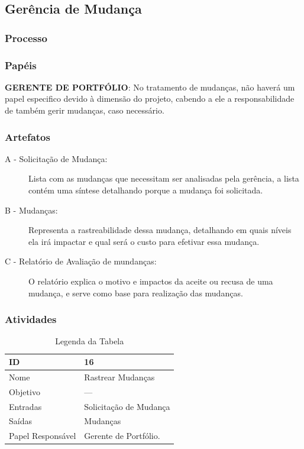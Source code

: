 \subsection{Gerência de Mudança}\label{sec:gerencia}
\subsubsection{Processo}
\subsubsection{Papéis}

  \textbf{GERENTE DE PORTFÓLIO}: No tratamento de mudanças, não haverá um papel especifico devido
à dimensão do projeto, cabendo a ele a responsabilidade de também gerir mudanças, caso necessário.

\subsubsection{Artefatos}

\begin{description}
  \item[A - Solicitação de Mudança: ]
  Lista com as mudanças que necessitam ser analisadas pela gerência, a lista contém
  uma síntese detalhando porque a mudança foi solicitada.
  \item [B - Mudanças: ] Representa a rastreabilidade dessa mudança, detalhando em
  quais níveis ela irá impactar e qual será o custo para efetivar essa mudança.
  \item [C - Relatório de Avaliação de mundanças: ] O relatório explica o motivo e impactos da aceite
  ou recusa de uma mudança, e serve como base para realização das mudanças.
\end{description}

\subsubsection{Atividades}

\begin{table}[H]
  \centering
    \begin{tabular}{| m{5em} | m{10cm} |}
      \hline
      ID       & 16   \\ \hline
      Nome     & Rastrear Mudanças  \\ \hline
      Objetivo & ---  \\ \hline
      Entradas & Solicitação de Mudança\\ \hline
      Saídas   & Mudanças \\ \hline
      Papel Responsável   & Gerente de Portfólio. \\ \hline
    \end{tabular}
    \caption{Legenda da Tabela}
    \label{tabela:atividade16}
\end{table}

